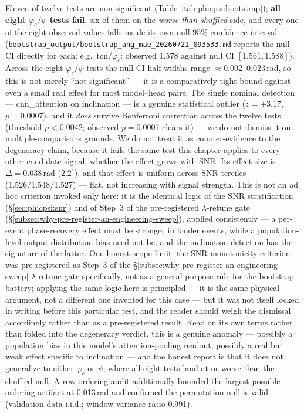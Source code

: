 Eleven of twelve tests are non-significant (Table~\ref{tab:phicpsi:bootstrap}); \textbf{all eight $\varphi_c/\psi$ tests fail}, six of them on the \emph{worse-than-shuffled} side, and every one of the eight observed values falls inside its own null 95\% confidence interval (\texttt{bootstrap\_output/bootstrap\_ang\_mae\_20260721\_093533.md} reports the null CI directly for each; e.g.\ tcn/$\varphi_c$: observed 1.578 against null CI $[1.561, 1.588]$).
Across the eight $\varphi_c/\psi$ tests the null-CI half-widths range ${\approx}0.002$--$0.023$\,rad, so this is not merely ``not significant'' --- it is a comparatively tight bound against even a small real effect for most model--head pairs.
The single nominal detection --- cnn\_attention on inclination --- is a genuine statistical outlier ($z=+3.17$, $p=0.0007$), and it \emph{does} survive Bonferroni correction across the twelve tests (threshold $p < 0.0042$; observed $p = 0.0007$ clears it) --- we do not dismiss it on multiple-comparisons grounds.
We do not treat it as counter-evidence to the degeneracy claim, because it fails the same test this chapter applies to every other candidate signal: whether the effect grows with SNR.
Its effect size is $\Delta = 0.038$\,rad ($2.2^\circ$), and that effect is uniform across SNR terciles (1.526/1.548/1.527) --- flat, not increasing with signal strength.
This is not an ad hoc criterion invoked only here: it is the identical logic of the SNR stratification (\S\ref{sec:phicpsi:snr}) and of Step~3 of the pre-registered $\lambda$-retune gate (\S\ref{subsec:why-pre-register-an-engineering-sweep}), applied consistently --- a per-event phase-recovery effect must be stronger in louder events, while a population-level output-distribution bias need not be, and the inclination detection has the signature of the latter.
One honest scope limit: the SNR-monotonicity criterion was pre-registered as Step~3 of the \S\ref{subsec:why-pre-register-an-engineering-sweep} $\lambda$-retune gate specifically, not as a general-purpose rule for the bootstrap battery; applying the same logic here is principled --- it is the same physical argument, not a different one invented for this case --- but it was not itself locked in writing before this particular test, and the reader should weigh the dismissal accordingly rather than as a pre-registered result.
Read on its own terms rather than folded into the degeneracy verdict, this is a genuine anomaly --- possibly a population bias in this model's attention-pooling readout, possibly a real but weak effect specific to inclination --- and the honest report is that it does not generalize to either $\varphi_c$ or $\psi$, where all eight tests land at or worse than the shuffled null.
A row-ordering audit additionally bounded the largest possible ordering artifact at 0.013\,rad and confirmed the permutation null is valid (validation data i.i.d.; window variance ratio 0.991).

